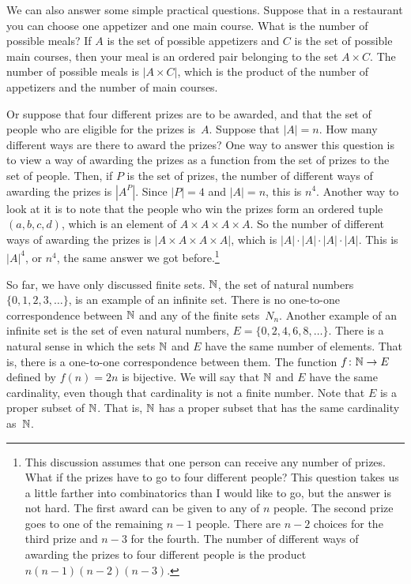 We can also answer some simple practical questions.  Suppose that in
a restaurant you can choose one appetizer and one main course.  What is the
number of possible meals?  If $A$ is the set of possible appetizers and $C$ is the
set of possible main courses, then your meal is an ordered pair belonging
to  the set $A\times C$.  The number of possible meals is $|A\times C|$,
which is the product of the number of appetizers and the number of main courses.

Or suppose that four different prizes are to be awarded, and that the set of people
who are eligible for the prizes is~$A$.  Suppose that $|A|=n$.
How many different ways are there
to award the prizes?  One way to answer this question is to view a way of
awarding the prizes as a function from the set of prizes to the set of people.
Then, if $P$ is the set of prizes, the number of different ways of awarding
the prizes is $\left|A^P\right|$.  Since $|P|=4$ and $|A|=n$, this is $n^4$.  Another
way to look at it is to note that the people who win the prizes form
an ordered tuple $(a,b,c,d)$, which is an element of $A\times A\times A\times A$.
So the number of different ways of awarding the prizes is
$|A\times A\times A\times A|$, which is $|A|\cdot |A|\cdot |A|\cdot |A|$.  This
is $|A|^4$, or $n^4$, the same answer we got before.\footnote{This discussion assumes that one person can 
receive any number of prizes.
What if the prizes have to go to four different people?   This question
takes us a little farther into combinatorics than I would like to go,
but the answer is not hard.  The first award can be given to any of $n$
people.  The second prize goes to one of the remaining $n-1$ people.  There
are $n-2$ choices for the third prize and $n-3$ for the fourth.  The
number of different ways of awarding the prizes to four different people
is the product $n(n-1)(n-2)(n-3)$.}

\medbreak

So far, we have only discussed finite sets.  ${\mathbb N}$, the set of natural
numbers $\{0,1,2,3,\dots\}$, is an example of an infinite set.  There
is no one-to-one correspondence between ${\mathbb N}$ and any of the finite sets~$N_n$.  
Another example of an infinite set is the set of even natural numbers,
$E=\{0,2,4,6,8,\dots\}$.  There is a natural sense in which the sets ${\mathbb N}$
and $E$ have the same number of elements.  That is, there is a one-to-one
correspondence between them.  The function $f\colon {\mathbb N}\to E$ defined
by $f(n)=2n$ is bijective.  We will say that ${\mathbb N}$ and $E$ have the same
cardinality, even though that cardinality is not
a finite number.  Note that $E$ is a proper subset of ${\mathbb N}$.  That is,
${\mathbb N}$ has a proper subset that has the same cardinality as~${\mathbb N}$.

